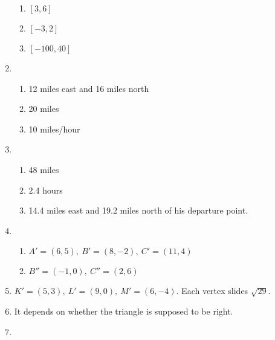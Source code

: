 \documentclass{article}
\begin{document}
\begin{enumerate}
\begin{enumerate}
	\item $[3, 6]$
	
	\item $[-3, 2]$
	
	\item $[-100, 40]$
	
	\end{enumerate}
	
\item

	\begin{enumerate}
	
	\item 12 miles east and 16 miles north
	
	\item 20 miles
	
	\item 10 miles/hour
	
	\end{enumerate}
	
\item

	\begin{enumerate}
	
	\item 48 miles
	
	\item 2.4 hours
	
	\item 14.4 miles east and 19.2 miles north of his departure point.
	
	\end{enumerate}
	
\item

	\begin{enumerate}
	
	\item $A' = (6, 5), \ B' = (8, -2), \ C' = (11,4)$
	
	\item $B'' = (-1, 0), \ C'' = (2, 6)$
	
	\end{enumerate}
	
\item $K' = (5, 3), \ L' = (9, 0), \ M' = (6, -4)$. Each vertex slides $\sqrt{29}$.

\item It depends on whether the triangle is supposed to be right.

\item 

	\begin{enumerate}
	

\end{enumerate}
\end{enumerate}
\end{document}
